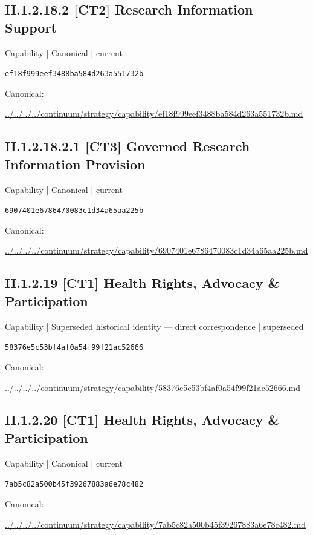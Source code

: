 \documentclass[10pt,a4paper]{article}
\begin{document}
\subsection*{II.1.2.18.2 [CT2] Research Information Support}
{\small Capability | Canonical | current}\par
\texttt{ef18f999eef3488ba584d263a551732b}\par
Canonical: \par
{\footnotesize\url{../../../../continuum/strategy/capability/ef18f999eef3488ba584d263a551732b.md}}\par
\subsection*{II.1.2.18.2.1 [CT3] Governed Research Information Provision}
{\small Capability | Canonical | current}\par
\texttt{6907401e6786470083c1d34a65aa225b}\par
Canonical: \par
{\footnotesize\url{../../../../continuum/strategy/capability/6907401e6786470083c1d34a65aa225b.md}}\par
\subsection*{II.1.2.19 [CT1] Health Rights, Advocacy \& Participation}
{\small Capability | Superseded historical identity — direct correspondence | superseded}\par
\texttt{58376e5c53bf4af0a54f99f21ac52666}\par
Canonical: \par
{\footnotesize\url{../../../../continuum/strategy/capability/58376e5c53bf4af0a54f99f21ac52666.md}}\par
\subsection*{II.1.2.20 [CT1] Health Rights, Advocacy \& Participation}
{\small Capability | Canonical | current}\par
\texttt{7ab5c82a500b45f39267883a6e78c482}\par
Canonical: \par
{\footnotesize\url{../../../../continuum/strategy/capability/7ab5c82a500b45f39267883a6e78c482.md}}\par
\end{document}
